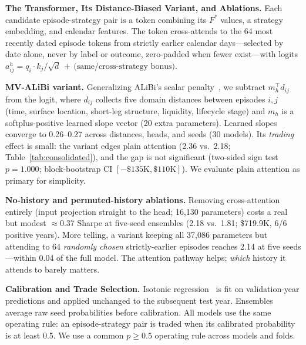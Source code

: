 \documentclass[sigconf,review]{acmart}
\begin{document}
\medskip\noindent\textbf{The Transformer, Its Distance-Biased Variant, and Ablations.}
\label{sec:transformer}
Each candidate episode-strategy pair is a token combining its $F^{\ast}$ values, a strategy embedding, and calendar features. The token cross-attends to the 64 most recently dated episode tokens from strictly earlier calendar days---selected by date alone, never by label or outcome, zero-padded when fewer exist---with logits
$a^{h}_{ij}=q_i\!\cdot\!k_j/\sqrt{d}\,+\,\text{(same/cross-strategy bonus)}$.

\noindent\textbf{MV-ALiBi variant.} Generalizing ALiBi's scalar penalty~\cite{press2022alibi}, we subtract $m_h^{\top}d_{ij}$ from the logit, where $d_{ij}$ collects five domain distances between episodes $i,j$ (time, surface location, short-leg structure, liquidity, lifecycle stage) and $m_h$ is a softplus-positive learned slope vector (20 extra parameters). Learned slopes converge to 0.26--0.27 across distances, heads, and seeds (30 models). Its \emph{trading} effect is small: the variant edges plain attention (2.36 vs.\ 2.18; Table~\ref{tab:consolidated}), and the gap is not significant (two-sided sign test $p=1.000$; block-bootstrap CI $[-\$135\text{K},\$110\text{K}]$). We evaluate plain attention as primary for simplicity.

\noindent\textbf{No-history and permuted-history ablations.}
\label{sec:ablations}
Removing cross-attention entirely (input projection straight to the head; 16{,}130 parameters) costs a real but modest $\approx$0.37 Sharpe at five-seed ensembles (2.18 vs.\ 1.81; \$719.9K, 6/6 positive years). More telling, a variant keeping all 37{,}086 parameters but attending to 64 \emph{randomly chosen} strictly-earlier episodes reaches 2.14 at five seeds---within 0.04 of the full model. The attention pathway helps; \emph{which} history it attends to barely matters.

\medskip\noindent\textbf{Calibration and Trade Selection.}
\label{sec:calibration}
Isotonic regression~\cite{zadrozny2002transforming} is fit on validation-year predictions and applied unchanged to the subsequent test year. Ensembles average raw seed probabilities before calibration. All models use the same operating rule: an episode-strategy pair is traded when its calibrated probability is at least 0.5. We use a common $p\ge0.5$ operating rule across models and folds.
\end{document}
